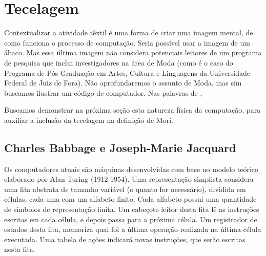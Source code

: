 \section{Tecelagem}\label{sec:tecelagem}

Contextualizar a atividade têxtil é uma forma de criar uma imagem mental, de como funciona o processo de computação. Seria possível usar a imagem de um ábaco. Mas essa última imagem não considera potenciais leitores de um programa de pesquisa que inclui investigadores na área de Moda (como é o caso do Programa de Pós Graduação em Artes, Cultura e Linguagens da Universidade Federal de Juiz de Fora). Não aprofundaremos o assunto de Moda, mas sim buscamos ilustrar um código de computador. Nas palavras de ,

\begin{citacao}
\end{citacao}

Buscamos demonstrar na próxima seção esta natureza física da computação, para auxiliar a inclusão da tecelagem na definição de Mori.

\subsection{Charles Babbage e Joseph-Marie Jacquard}

Os computadores atuais são máquinas desenvolvidas com base no modelo teórico elaborado por Alan Turing (1912-1954). Uma representação simplista considera uma fita abstrata de tamanho variável (o quanto for necessário), dividida em células, cada uma com um alfabeto finito. Cada alfabeto possui uma quantidade de símbolos de representação finita. Um cabeçote leitor desta fita lê as instruções escritas em cada célula, e depois passa para a próxima célula. Um registrador de estados desta fita, memoriza qual foi a última operação realizada na última célula executada. Uma tabela de ações indicará novas instruções, que serão escritas nesta fita.


